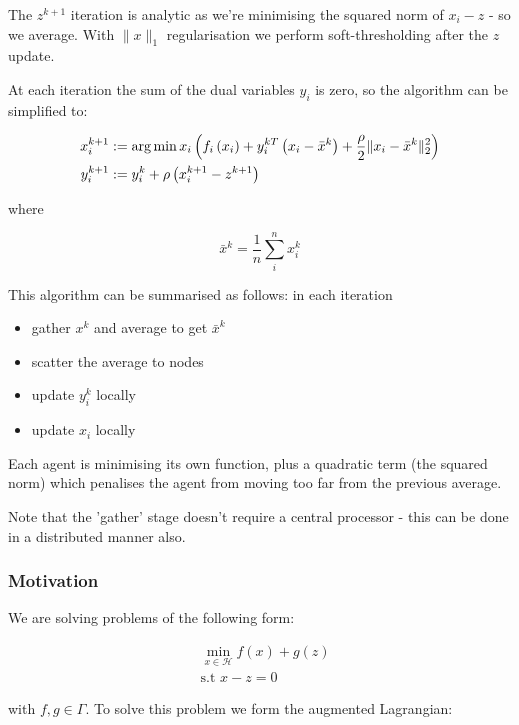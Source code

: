 \begin{example}[Consensus]
The \(z^{k+1}\) iteration is analytic as we're minimising the squared norm of \(x_i - z\) - so we average. With \(\|x\|_1\) regularisation we perform soft-thresholding after the \(z\) update.

At each iteration the sum of the dual variables \(y_i\) is zero, so the algorithm can be simplified to:

\begin{align}
x_i^{k+1} &:= \operatorname*{arg\,min}{x_i} \left(f_i\left( x_i \right) + y_i^{kT}\left(x_i-\bar{x}^k\right) + \frac{\rho}{2}\|x_i-\bar{x}^k\|_2^2\right)\\
y_i^{k+1} &:= y_i^{k} + \rho \left(x_i^{k+1} - z^{k+1} \right)
\label{simple_consensus_iterations}
\end{align}
 
where

\begin{equation}
\bar{x}^k = \frac{1}{n} \sum_i^n x_i^k
\end{equation}

This algorithm can be summarised as follows: in each iteration

\begin{itemize}
\item gather \(x^k\) and average to get \(\bar{x}^k\)
\item scatter the average to nodes
\item update \(y_i^k\) locally
\item update \(x_i\) locally
\end{itemize}

Each agent is minimising its own function, plus a quadratic term (the squared norm) which penalises the agent from moving too far from the previous average.

Note that the 'gather' stage doesn't require a central processor - this can be done in a distributed manner also.
\end{example}

\subsubsection{Motivation}
We are solving problems of the following form:

\begin{align}
&\min_{x \in \mathcal{H}} f\left(x\right) + g\left(z\right)\\
&\text{s.t } x - z = 0
\end{align}

with \(f, g \in \Gamma\). To solve this problem we form the augmented Lagrangian: 

